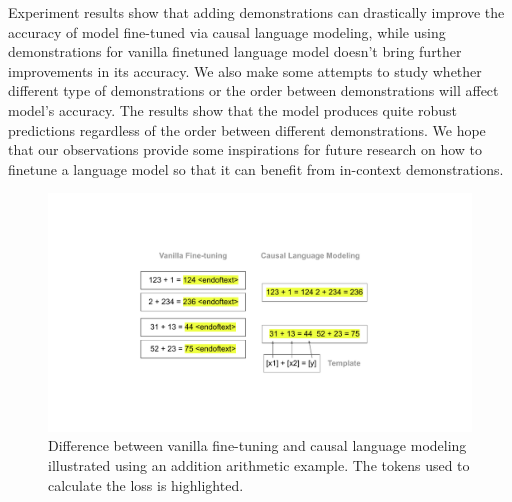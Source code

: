 Experiment results show that adding demonstrations can drastically improve the accuracy of model fine-tuned via causal language modeling, while using demonstrations for vanilla finetuned language model doesn't bring further improvements in its accuracy. 
We also make some attempts to study whether different type of demonstrations or the order between demonstrations will affect model's accuracy. The results show that the model produces quite robust predictions regardless of the order between different demonstrations.
We hope that our observations provide some inspirations for future research on how to finetune a language model so that it can benefit from in-context demonstrations.

\begin{figure}[th]
\begin{center}
\includegraphics[width = \columnwidth]{figs/diff-vanilla-clm.pdf}
 \caption{Difference between vanilla fine-tuning and causal language modeling illustrated using an addition arithmetic example. The tokens used to calculate the loss is highlighted.}
 \label{fig:diff}
\end{center}
\end{figure}


